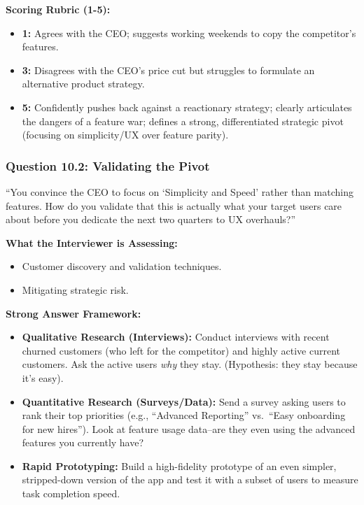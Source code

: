 \documentclass[
  11pt,
  openany,
  oneside]{book}
\providecommand{\tightlist}{%
  \setlength{\itemsep}{0pt}\setlength{\parskip}{0pt}}
\begin{document}
\textbf{Scoring Rubric (1-5):}

\begin{itemize}
\tightlist
\item
  \textbf{1:} Agrees with the CEO; suggests working weekends to copy the
  competitor's features.
\item
  \textbf{3:} Disagrees with the CEO's price cut but struggles to
  formulate an alternative product strategy.
\item
  \textbf{5:} Confidently pushes back against a reactionary strategy;
  clearly articulates the dangers of a feature war; defines a strong,
  differentiated strategic pivot (focusing on simplicity/UX over feature
  parity).
\end{itemize}

\subsubsection{Question 10.2: Validating the
Pivot}\label{question-10.2-validating-the-pivot}

``You convince the CEO to focus on `Simplicity and Speed' rather than
matching features. How do you validate that this is actually what your
target users care about before you dedicate the next two quarters to UX
overhauls?''

\textbf{What the Interviewer is Assessing:}

\begin{itemize}
\tightlist
\item
  Customer discovery and validation techniques.
\item
  Mitigating strategic risk.
\end{itemize}

\textbf{Strong Answer Framework:}

\begin{itemize}
\tightlist
\item
  \textbf{Qualitative Research (Interviews):} Conduct interviews with
  recent churned customers (who left for the competitor) and highly
  active current customers. Ask the active users \emph{why} they stay.
  (Hypothesis: they stay because it's easy).
\item
  \textbf{Quantitative Research (Surveys/Data):} Send a survey asking
  users to rank their top priorities (e.g., ``Advanced Reporting''
  vs.~``Easy onboarding for new hires''). Look at feature usage
  data--are they even using the advanced features you currently have?
\item
  \textbf{Rapid Prototyping:} Build a high-fidelity prototype of an even
  simpler, stripped-down version of the app and test it with a subset of
  users to measure task completion speed.
\end{itemize}
\end{document}

